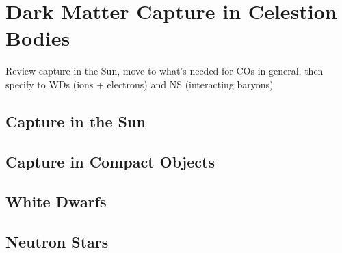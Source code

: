 \graphicspath{{img/chapter_2/}}

\chapter{Dark Matter Capture in Celestion Bodies}
\label{chapter:capture}

\begin{synopsis}
  Review capture in the Sun, move to what's needed for COs in general, then specify to WDs (ions + electrons) and NS (interacting baryons)
\end{synopsis}

\section{Capture in the Sun}

\section{Capture in Compact Objects}

\section{White Dwarfs}

\section{Neutron Stars}